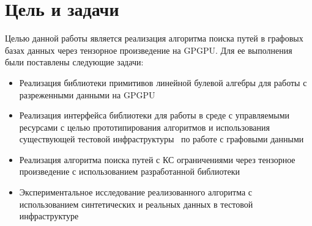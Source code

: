\section{Цель и задачи}

Целью данной работы является реализация алгоритма поиска путей в графовых базах данных через тензорное произведение на GPGPU. Для ее выполнения были поставлены следующие задачи:

\begin{itemize}
    \item Реализация библиотеки примитивов линейной булевой алгебры для работы с разреженными данными на GPGPU
    \item Реализация интерфейса библиотеки для работы в среде с управляемыми ресурсами с целью  прототипирования алгоритмов и использования существующей тестовой инфраструктуры~\cite{net:cfpq_py_algo} по работе с графовыми данными 
    \item Реализация алгоритма поиска путей с КС ограничениями через тензорное произведение с использованием разработанной библиотеки
    \item Экспериментальное исследование реализованного алгоритма с использованием синтетических и реальных данных в тестовой инфраструктуре
\end{itemize}